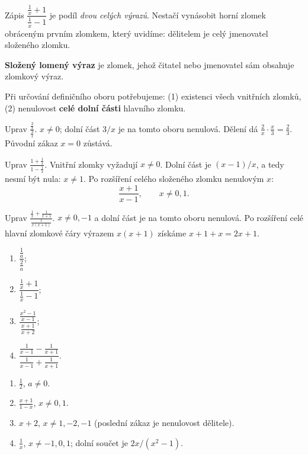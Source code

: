 \documentclass[11pt,a4paper]{article}
\begin{document}
Zápis $\dfrac{\frac{1}{x}+1}{\frac{1}{x}-1}$ je podíl \emph{dvou celých výrazů}. Nestačí vynásobit horní zlomek obráceným prvním zlomkem, který uvidíme: dělitelem je celý jmenovatel složeného zlomku.
\begin{definiceBox}[title={Definice - Složený lomený výraz}]
\textbf{Složený lomený výraz} je zlomek, jehož čitatel nebo jmenovatel sám obsahuje zlomkový výraz.
\end{definiceBox}
Při určování definičního oboru potřebujeme: (1) existenci všech vnitřních zlomků, (2) nenulovost \textbf{celé dolní části} hlavního zlomku.
\begin{prikladReseniBox}[breakable=false,title={Příklad 1}]
Uprav $\displaystyle\frac{\frac2x}{\frac3x}$.
\tcblower
$x\ne0$; dolní část $3/x$ je na tomto oboru nenulová. Dělení dá $\frac2x\cdot\frac x3=\frac23$. Původní zákaz $x=0$ zůstává.
\end{prikladReseniBox}
\begin{prikladReseniBox}[breakable=false,title={Příklad 2}]
Uprav $\displaystyle\frac{1+\frac1x}{1-\frac1x}$.
\tcblower
Vnitřní zlomky vyžadují $x\ne0$. Dolní část je $(x-1)/x$, a tedy nesmí být nula: $x\ne1$. Po rozšíření celého složeného zlomku nenulovým $x$:
\[\frac{x+1}{x-1},\qquad x\ne0,1.\]
\end{prikladReseniBox}
\begin{prikladReseniBox}[breakable=false,title={Příklad 3}]
Uprav $\displaystyle\frac{\frac1x+\frac1{x+1}}{\frac1{x(x+1)}}$.
\tcblower
$x\ne0,-1$ a dolní část je na tomto oboru nenulová. Po rozšíření celé hlavní zlomkové čáry výrazem $x(x+1)$ získáme $x+1+x=2x+1$.
\end{prikladReseniBox}
\begin{zadaniReseniBox}[breakable=false,title={Samostatná práce 1}]
\begin{enumerate}[label=\alph*)]
\item $\dfrac{\frac1a}{\frac2a}$;
\item $\dfrac{\frac1x+1}{\frac1x-1}$;
\item $\dfrac{\frac{x^2-1}{x-1}}{\frac{x+1}{x+2}}$;
\item $\dfrac{\frac1{x-1}-\frac1{x+1}}{\frac1{x-1}+\frac1{x+1}}$.
\end{enumerate}
\tcblower
\begin{enumerate}[label=\alph*)]
\item $\frac12$, $a\ne0$.
\item $\frac{x+1}{1-x}$, $x\ne0,1$.
\item $x+2$, $x\ne1,-2,-1$ (poslední zákaz je nenulovost dělitele).
\item $\frac1x$, $x\ne-1,0,1$; dolní součet je $2x/(x^2-1)$.
\end{enumerate}
\end{zadaniReseniBox}
\end{document}
